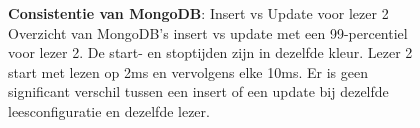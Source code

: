 \begin{figure}[ht!] 
	\centering
	\caption{\textbf{Consistentie van MongoDB}: Insert vs Update voor lezer 2 \newline
	Overzicht van MongoDB's insert vs update met een 99-percentiel voor lezer 2. De start- en stoptijden zijn in dezelfde kleur. Lezer 2 start met lezen op 2ms en vervolgens elke 10ms. Er is geen significant verschil tussen een insert of een update bij dezelfde leesconfiguratie en dezelfde lezer.  }
	\label{fig:consistentie-mongodb-update-vs-insert}
\end{figure}



